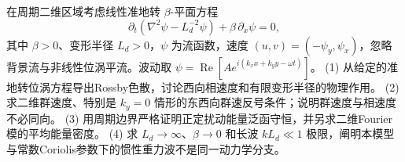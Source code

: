 在周期二维区域考虑线性准地转 \(\beta\)-平面方程
\[
\partial_t(\nabla^2\psi-L_d^{-2}\psi)+\beta\,\partial_x\psi=0,
\]
其中 \(\beta>0\)、变形半径 \(L_d>0\)，\(\psi\) 为流函数，速度 \((u,v)=(-\psi_y,\psi_x)\)，忽略背景流与非线性位涡平流。波动取 \(\psi=\operatorname{Re}[A e^{i(k_xx+k_yy-\omega t)}]\)。
(1) 从给定的准地转位涡方程导出Rossby色散，讨论西向相速度和有限变形半径的物理作用。
(2) 求二维群速度、特别是 \(k_y=0\) 情形的东西向群速反号条件；说明群速度与相速度不必同向。
(3) 用周期边界严格证明正定扰动能量泛函守恒，并另求二维Fourier模的平均能量密度。
(4) 求 \(L_d\to\infty\)、\(\beta\to0\) 和长波 \(kL_d\ll1\) 极限，阐明本模型与常数Coriolis参数下的惯性重力波不是同一动力学分支。
